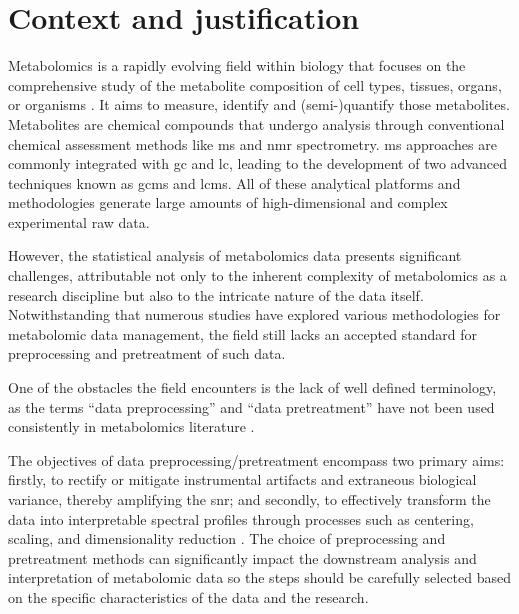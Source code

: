 \documentclass[ENG, BIB]{TFUOC}%
\begin{document}
\section{Context and justification}

Metabolomics is a rapidly evolving field within biology that focuses on the comprehensive study of the metabolite composition of cell types, tissues, organs, or organisms \cite{pattiMetabolomicsApogeeOmics2012,zhangSerumMetabolomicsNovel2012,chenGuideMetabolomicsAnalysis2022a}. It aims to measure, identify and (semi-)quantify those metabolites. Metabolites are chemical compounds that undergo analysis through conventional chemical assessment methods like \gls{ms} and \gls{nmr} spectrometry. \gls{ms} approaches are commonly integrated with \gls{gc} and \gls{lc}, leading to the development of two advanced techniques known as \gls{gcms} and \gls{lcms}. All of these analytical platforms and methodologies generate large amounts of high-dimensional and complex experimental raw data.

However, the statistical analysis of metabolomics data presents significant challenges, attributable not only to the inherent complexity of metabolomics as a research discipline but also to the intricate nature of the data itself. Notwithstanding that numerous studies have explored various methodologies for metabolomic data management, the field still lacks an accepted standard for preprocessing and pretreatment of such data.

One of the obstacles the field encounters is the lack of well defined terminology, as the terms “data preprocessing” and “data pretreatment” have not been used consistently in metabolomics literature \cite{sunPretreatingNormalizingMetabolomics2024}.

The objectives of data preprocessing/pretreatment encompass two primary aims: firstly, to rectify or mitigate instrumental artifacts and extraneous biological variance, thereby amplifying the \gls{snr}; and secondly, to effectively transform the data into interpretable spectral profiles through processes such as centering, scaling, and dimensionality reduction \cite{sunPretreatingNormalizingMetabolomics2024,martinPepsNMR1HNMR2018}. The choice of preprocessing and pretreatment methods can significantly impact the downstream analysis and interpretation of metabolomic data \cite{karamanPreprocessingPretreatmentMetabolomics2017} so the steps should be carefully selected based on the specific characteristics of the data and the research.
\end{document}
